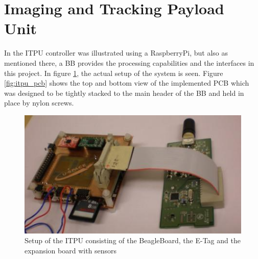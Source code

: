  
\section{Imaging and Tracking Payload Unit}
\label{sec:changes_itpu}

In \cite{CDR} the \ac{ITPU} controller was illustrated using a RaspberryPi, but also as mentioned there, a \ac{BB} provides the processing capabilities and the interfaces in this project. In figure \ref{fig:itpu_setup}, the actual setup of the system is seen. Figure \ref{fig:itpu_pcb} shows the top and bottom view of the implemented \ac{PCB} which was designed to be tightly stacked to the main header of the BB and held in place by nylon screws.
%
\begin{figure}
\begin{centering}
\includegraphics[height=0.25\textheight]{figures/itpu-setup.jpg}
\par\end{centering}
\caption{Setup of the ITPU consisting of the BeagleBoard, the E-Tag and the expansion board with sensors}
\label{fig:itpu_setup}
\end{figure}
%
%

